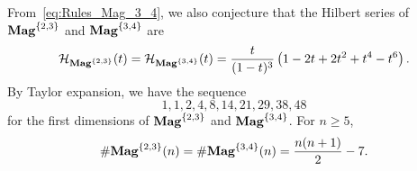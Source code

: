 From~\eqref{eq:Rules_Mag_3_4}, we also conjecture that the Hilbert
series of $\mathbf{Mag}^{\{2, 3\}}$ and $\mathbf{Mag}^{\{3, 4\}}$ are
\begin{equation}
    \mathcal{H}_{\mathbf{Mag}^{\{2, 3\}}}(t) =
    \mathcal{H}_{\mathbf{Mag}^{\{3, 4\}}}(t) =
    \frac{t}{(1 - t)^3}
    \left(1 - 2t + 2t^2 + t^4 - t^6\right).
\end{equation}
By Taylor expansion, we have the sequence
\begin{equation}
    1, 1, 2, 4, 8, 14, 21, 29, 38, 48
\end{equation}
for the first dimensions of $\mathbf{Mag}^{\{2, 3\}}$ and $\mathbf{Mag}^{\{3, 4\}}$.
For $n \geq 5$,
\begin{equation}
    \#\mathbf{Mag}^{\{2, 3\}}(n) =\#\mathbf{Mag}^{\{3, 4\}}(n) = \frac{n(n+1)}{2} - 7.
\end{equation}
\medbreak
